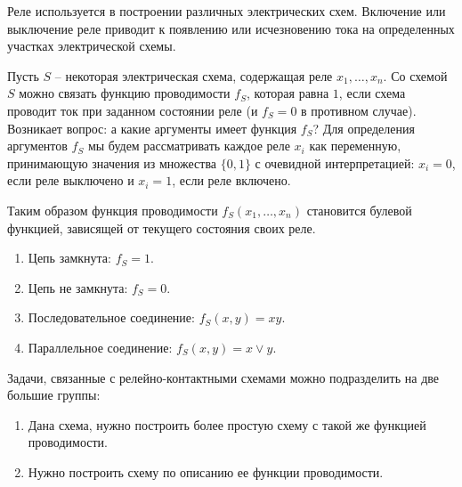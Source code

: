 \begin{note}   
    Реле используется в построении различных электрических схем. Включение или выключение реле приводит к появлению или исчезновению тока на определенных участках электрической схемы.

    Пусть $S$ -- некоторая электрическая схема, содержащая реле $x_1,\ldots,x_n$. Со схемой $S$ можно связать функцию проводимости $f_S$, которая равна $1$, если схема проводит ток при заданном состоянии реле (и $f_S = 0$ в противном случае). Возникает вопрос: а какие аргументы имеет функция $f_S$? Для определения аргументов $f_S$ мы будем рассматривать каждое реле $x_i$ как переменную, принимающую значения из множества $\{0,1\}$ с очевидной интерпретацией: $x_i = 0$, если реле выключено и $x_i = 1$, если реле включено.
    
    Таким образом функция проводимости $f_S(x_1,\ldots,x_n)$ становится булевой функцией, зависящей от текущего состояния своих реле.
    \begin{enumerate}
        \item Цепь замкнута: $f_S = 1$.
        \item Цепь не замкнута: $f_S = 0$.
        \item Последовательное соединение: $f_S(x,y) = xy$.
        \item Параллельное соединение: $f_S(x,y) = x \lor y$.
    \end{enumerate}
    
    Задачи, связанные с релейно-контактными схемами можно подразделить на две большие группы:
    \begin{enumerate}
        \item Дана схема, нужно построить более простую схему с такой же функцией проводимости.
        \item Нужно построить схему по описанию ее функции проводимости.
    \end{enumerate}
\end{note} 

\newpage